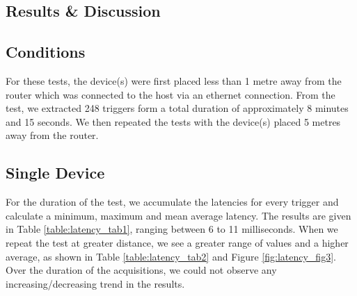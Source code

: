 \subsection{Results \& Discussion}

\subsection*{Conditions}
For these tests, the device(s) were first placed less than 1 metre away from the router which was connected to the host via an ethernet connection. From the test, we extracted 248 triggers form a total duration of approximately 8 minutes and 15 seconds. We then repeated the tests with the device(s) placed 5 metres away from the router.

\subsection*{Single Device}
For the duration of the test, we accumulate the latencies for every trigger and calculate a minimum, maximum and mean average latency. The results are given in Table \ref{table:latency_tab1}, ranging between 6 to 11 milliseconds. When we repeat the test at greater distance, we see a greater range of values and a higher average, as shown in Table \ref{table:latency_tab2} and Figure \ref{fig:latency_fig3}. Over the duration of the acquisitions, we could not observe any increasing/decreasing trend in the results.



